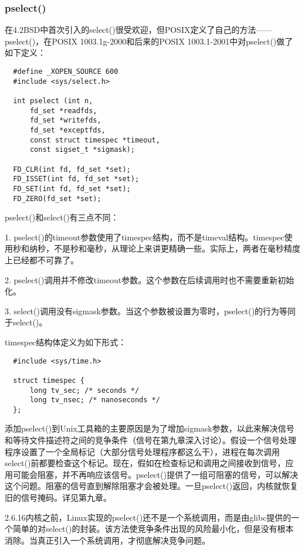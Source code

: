 \subsubsection{pselect()}

在4.2BSD中首次引入的select()很受欢迎，但POSIX定义了自己的方法——pselect()，在POSIX 1003.1g-2000和后来的POSIX 1003.1-2001中对pselect()做了如下定义： 

\begin{lstlisting}
  #define _XOPEN_SOURCE 600
  #include <sys/select.h>

  int pselect (int n,
      fd_set *readfds,
      fd_set *writefds,
      fd_set *exceptfds,
      const struct timespec *timeout,
      const sigset_t *sigmask);

  FD_CLR(int fd, fd_set *set);
  FD_ISSET(int fd, fd_set *set);
  FD_SET(int fd, fd_set *set);
  FD_ZERO(fd_set *set);
\end{lstlisting}

pselect()和select()有三点不同：

1. pselect()的timeout参数使用了timespec结构，而不是timeval结构。timespec使用秒和纳秒，不是秒和毫秒，从理论上来讲更精确一些。实际上，两者在毫秒精度上已经都不可靠了。

2. pselect()调用并不修改timeout参数。这个参数在后续调用时也不需要重新初始化。

3. select()调用没有sigmask参数。当这个参数被设置为零时，pselect()的行为等同于select()。

timespec结构体定义为如下形式： 

\begin{lstlisting}
  #include <sys/time.h>

  struct timespec {
      long tv_sec; /* seconds */
      long tv_nsec; /* nanoseconds */
  };
\end{lstlisting}

添加pselect()到Unix工具箱的主要原因是为了增加sigmask参数，以此来解决信号和等待文件描述符之间的竞争条件（信号在第九章深入讨论）。假设一个信号处理程序设置了一个全局标记（大部分信号处理程序都这么干），进程在每次调用select()前都要检查这个标记。现在，假如在检查标记和调用之间接收到信号，应用可能会阻塞，并不再响应该信号。pselect()提供了一组可阻塞的信号，可以解决这个问题。阻塞的信号直到解除阻塞才会被处理。一旦pselect()返回，内核就恢复旧的信号掩码。详见第九章。

2.6.16内核之前，Linux实现的pselect()还不是一个系统调用，而是由glibc提供的一个简单的对select()的封装。该方法使竞争条件出现的风险最小化，但是没有根本消除。当真正引入一个系统调用，才彻底解决竞争问题。

